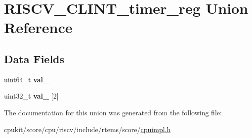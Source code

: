 \hypertarget{unionRISCV__CLINT__timer__reg}{}\section{R\+I\+S\+C\+V\+\_\+\+C\+L\+I\+N\+T\+\_\+timer\+\_\+reg Union Reference}
\label{unionRISCV__CLINT__timer__reg}
\subsection*{Data Fields}
\begin{DoxyCompactItemize}
\item 
\mbox{\label{unionRISCV__CLINT__timer__reg_a6f86cb9431ad5ddc95d1bd3c6a6f1296}} 
uint64\+\_\+t {\bfseries val\+\_}
\item 
\mbox{\label{unionRISCV__CLINT__timer__reg_a61bbb5584d0dd2a8d35a32fed7104ad0}} 
uint32\+\_\+t {\bfseries val\+\_} \mbox{[}2\mbox{]}
\end{DoxyCompactItemize}


The documentation for this union was generated from the following file\+:\begin{DoxyCompactItemize}
\item 
cpukit/score/cpu/riscv/include/rtems/score/\mbox{\hyperlink{riscv_2include_2rtems_2score_2cpuimpl_8h}{cpuimpl.\+h}}\end{DoxyCompactItemize}
